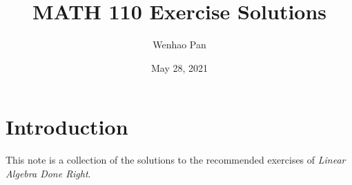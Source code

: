 \documentclass[12pt, lettersize]{article}
\title{MATH 110 Exercise Solutions}
\author{Wenhao Pan}
\date{May 28, 2021}
\begin{document}
	
	\maketitle
	
	\section*{Introduction}
	This note is a collection of the solutions to the recommended exercises of \textit{Linear Algebra Done Right}.	
	

	
\end{document}
